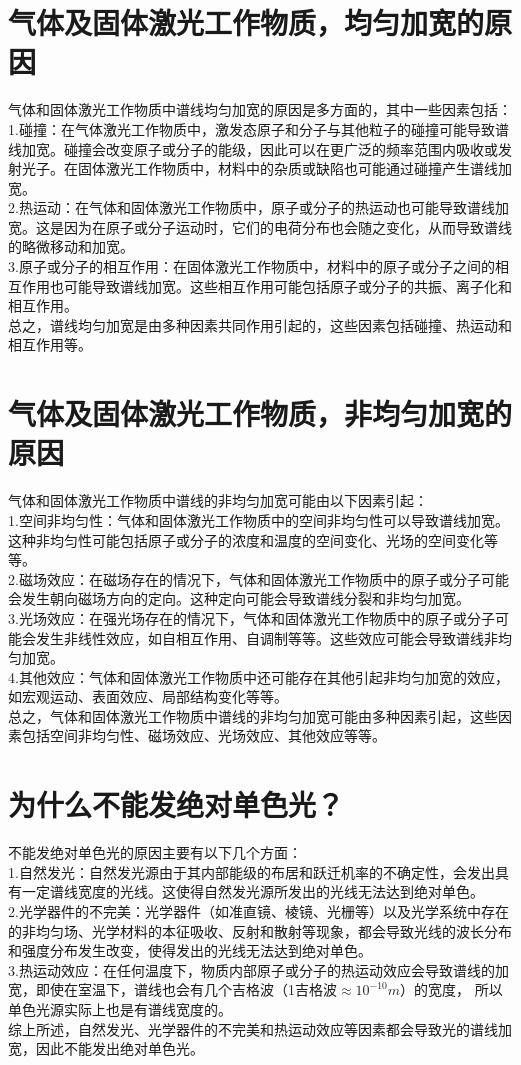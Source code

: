 \documentclass[12pt, a4paper, oneside]{article}
\begin{document}
\begin{spacing}{2.0}
\section{气体及固体激光工作物质，均匀加宽的原因}
气体和固体激光工作物质中谱线均匀加宽的原因是多方面的，其中一些因素包括：
\\
1.碰撞：在气体激光工作物质中，激发态原子和分子与其他粒子的碰撞可能导致谱线加宽。碰撞会改变原子或分子的能级，因此可以在更广泛的频率范围内吸收或发射光子。在固体激光工作物质中，材料中的杂质或缺陷也可能通过碰撞产生谱线加宽。
\\
2.热运动：在气体和固体激光工作物质中，原子或分子的热运动也可能导致谱线加宽。这是因为在原子或分子运动时，它们的电荷分布也会随之变化，从而导致谱线的略微移动和加宽。
\\
3.原子或分子的相互作用：在固体激光工作物质中，材料中的原子或分子之间的相互作用也可能导致谱线加宽。这些相互作用可能包括原子或分子的共振、离子化和相互作用。
\\
总之，谱线均匀加宽是由多种因素共同作用引起的，这些因素包括碰撞、热运动和相互作用等。
\section{气体及固体激光工作物质，非均匀加宽的原因}
气体和固体激光工作物质中谱线的非均匀加宽可能由以下因素引起：
\\
1.空间非均匀性：气体和固体激光工作物质中的空间非均匀性可以导致谱线加宽。这种非均匀性可能包括原子或分子的浓度和温度的空间变化、光场的空间变化等等。
\\
2.磁场效应：在磁场存在的情况下，气体和固体激光工作物质中的原子或分子可能会发生朝向磁场方向的定向。这种定向可能会导致谱线分裂和非均匀加宽。
\\
3.光场效应：在强光场存在的情况下，气体和固体激光工作物质中的原子或分子可能会发生非线性效应，如自相互作用、自调制等等。这些效应可能会导致谱线非均匀加宽。
\\
4.其他效应：气体和固体激光工作物质中还可能存在其他引起非均匀加宽的效应，如宏观运动、表面效应、局部结构变化等等。
\\
总之，气体和固体激光工作物质中谱线的非均匀加宽可能由多种因素引起，这些因素包括空间非均匀性、磁场效应、光场效应、其他效应等等。
\section{为什么不能发绝对单色光？}
不能发绝对单色光的原因主要有以下几个方面：
\\
1.自然发光：自然发光源由于其内部能级的布居和跃迁机率的不确定性，会发出具有一定谱线宽度的光线。这使得自然发光源所发出的光线无法达到绝对单色。
\\
2.光学器件的不完美：光学器件（如准直镜、棱镜、光栅等）以及光学系统中存在的非均匀场、光学材料的本征吸收、反射和散射等现象，都会导致光线的波长分布和强度分布发生改变，使得发出的光线无法达到绝对单色。
\\
3.热运动效应：在任何温度下，物质内部原子或分子的热运动效应会导致谱线的加宽，即使在室温下，谱线也会有几个吉格波（1吉格波$\approx 10^{-10}m$）的宽度，
所以单色光源实际上也是有谱线宽度的。
\\
综上所述，自然发光、光学器件的不完美和热运动效应等因素都会导致光的谱线加宽，因此不能发出绝对单色光。

\end{spacing}
\end{document}
